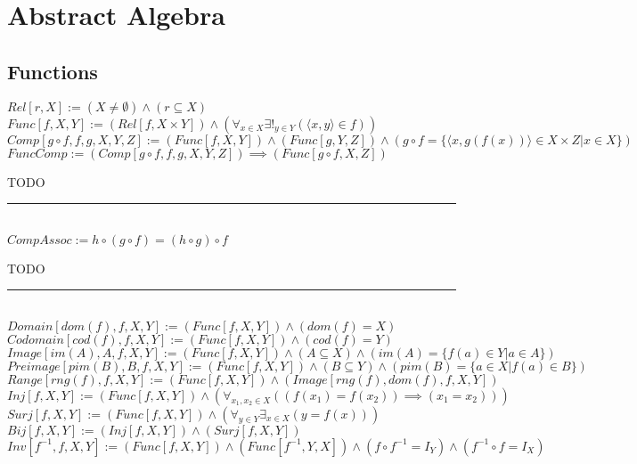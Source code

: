 \documentclass{book}
\newcommand{\abr}{:=}
\newcommand{\pr}[1]{\left(#1\right)}
\begin{document}
\chapter{Abstract Algebra}
\section{Functions}
$Rel[r, X] \abr (X \neq \emptyset) \land (r \subseteq X)$ \\
$Func[f, X, Y] \abr (Rel[f, X \times Y]) \land \pr{\forall_{x \in X} \exists!_{y \in Y}(\langle x, y \rangle \in f)}$ \\
$Comp[g \circ f, f, g, X, Y, Z] \abr (Func[f, X, Y]) \land (Func[g, Y, Z]) \land \pr{g \circ f = \{\langle x, g\pr{f(x)} \rangle \in X \times Z | x \in X\}}$ \\

$FuncComp \abr (Comp[g \circ f, f, g, X, Y, Z]) \implies (Func[g \circ f, X, Z])$
\begin{enumerate}
  \lit TODO
\end{enumerate} \vspace{.75mm} \hrule \vspace{.75mm} \ \\ 

$CompAssoc \abr h \circ (g \circ f) = (h \circ g) \circ f$
\begin{enumerate}
  \lit TODO
\end{enumerate} \vspace{.75mm} \hrule \vspace{.75mm} \ \\ 

$Domain[dom(f), f, X, Y] \abr (Func[f, X, Y]) \land \pr{dom(f) = X}$ \\
$Codomain[cod(f), f, X, Y] \abr (Func[f, X, Y]) \land \pr{cod(f) = Y}$ \\
$Image[im(A), A, f, X, Y] \abr (Func[f, X, Y]) \land (A \subseteq X) \land \pr{im(A) = \{f(a) \in Y | a \in A\}}$ \\
$Preimage[pim(B), B, f, X, Y] \abr (Func[f, X, Y]) \land (B \subseteq Y) \land \pr{pim(B) = \{a \in X | f(a) \in B\}}$ \\
$Range[rng(f), f, X, Y] \abr (Func[f, X, Y]) \land \pr{Image[rng(f), dom(f), f, X, Y]}$ \\

$Inj[f, X, Y] \abr (Func[f, X, Y]) \land \pr{\forall_{x_1, x_2 \in X}\pr{\pr{f(x_1) = f(x_2)} \implies (x_1 = x_2)}}$ \\ %
$Surj[f, X, Y] \abr (Func[f, X, Y]) \land \pr{\forall_{y \in Y} \exists_{x \in X}\pr{y = f(x)}}$ \\ %
$Bij[f, X, Y] \abr (Inj[f, X, Y]) \land (Surj[f, X, Y])$ \\ %
$Inv[f^{-1}, f, X, Y] \abr (Func[f, X, Y]) \land (Func[f^{-1}, Y, X]) \land (f \circ f^{-1} = I_Y) \land (f^{-1} \circ f = I_X)$ \\
\end{document}
